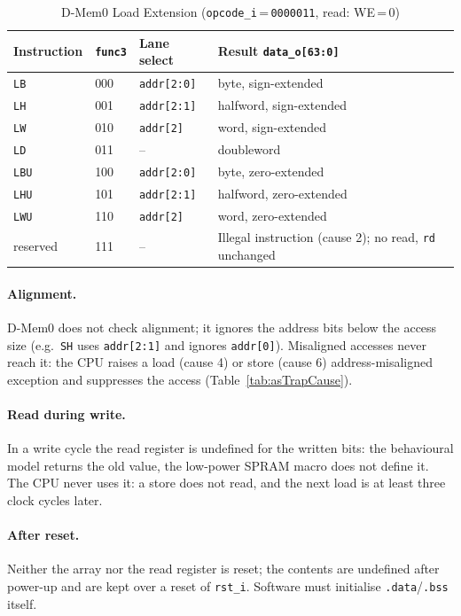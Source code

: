 \begin{table}[H]
\caption{D-Mem0 Load Extension (\texttt{opcode\_i}\,=\,\texttt{0000011}, read: WE\,=\,0)}
\label{tab:asDmemLoad}
\centering
\begin{tabularx}{\textwidth}{|l |l |l |X|}
  \hline
  Instruction & \texttt{func3} & Lane select & Result \texttt{data\_o[63:0]} \\
  \hline
  \hline
  \texttt{LB}  & 000 & \texttt{addr[2:0]} & byte, sign-extended \\
  \hline
  \texttt{LH}  & 001 & \texttt{addr[2:1]} & halfword, sign-extended \\
  \hline
  \texttt{LW}  & 010 & \texttt{addr[2]}   & word, sign-extended \\
  \hline
  \texttt{LD}  & 011 & --                 & doubleword \\
  \hline
  \texttt{LBU} & 100 & \texttt{addr[2:0]} & byte, zero-extended \\
  \hline
  \texttt{LHU} & 101 & \texttt{addr[2:1]} & halfword, zero-extended \\
  \hline
  \texttt{LWU} & 110 & \texttt{addr[2]}   & word, zero-extended \\
  \hline
  reserved    & 111 & --                 & Illegal instruction (cause 2); no read, \texttt{rd}
                       unchanged \\
  \hline
\end{tabularx}
\end{table}

\paragraph{Alignment.}
D-Mem0 does not check alignment; it ignores the address bits below the access
size (e.g.\ \texttt{SH} uses \texttt{addr[2:1]} and ignores \texttt{addr[0]}).
Misaligned accesses never reach it: the CPU raises a load (cause 4) or store
(cause 6) address-misaligned exception and suppresses the access
(Table~\ref{tab:asTrapCause}).

\paragraph{Read during write.}
In a write cycle the read register is undefined for the written bits: the
behavioural model returns the old value, the low-power SPRAM macro does not define
it. The CPU never uses it: a store does not read, and the next load is at
least three clock cycles later.

\paragraph{After reset.}
Neither the array nor the read register is reset; the contents are undefined
after power-up and are kept over a reset of \texttt{rst\_i}. Software must
initialise \texttt{.data}/\texttt{.bss} itself.

